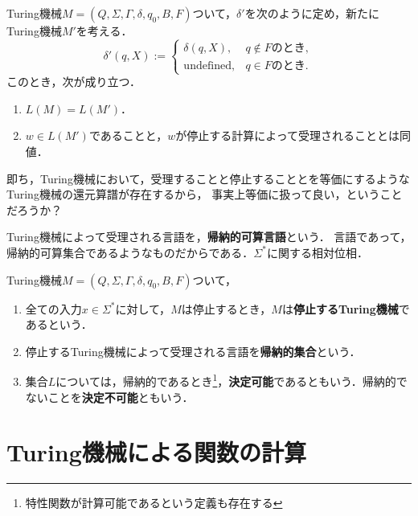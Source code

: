 \documentclass[uplatex, dvipdfmx]{jsreport}
\begin{document}
\begin{proposition}[Turing機械における停止の概念]\label{prop-haltness-in-Turing-machine}
    Turing機械$M=(Q,\Sigma,\Gamma,\delta,q_0,B,F)$ついて，$\delta'$を次のように定め，新たにTuring機械$M'$を考える．
    \[\delta'(q,X):=\begin{cases}
        \delta(q,X),&q\notin Fのとき,\\
        \mathrm{undefined},&q\in Fのとき.
    \end{cases}\]
    このとき，次が成り立つ．
    \begin{enumerate}
        \item $L(M)=L(M')$．
        \item $w\in L(M')$であることと，$w$が停止する計算によって受理されることとは同値．
    \end{enumerate}
\end{proposition}
\begin{remarks}
    即ち，Turing機械において，受理することと停止することとを等価にするようなTuring機械の還元算譜が存在するから，
    事実上等価に扱って良い，ということだろうか？
\end{remarks}

\begin{definition}
    Turing機械によって受理される言語を，\textbf{帰納的可算言語}という．
    言語であって，帰納的可算集合であるようなものだからである．$\Sigma^*$に関する相対位相．
\end{definition}

\begin{definition}
    Turing機械$M=(Q,\Sigma,\Gamma,\delta,q_0,B,F)$ついて，
    \begin{enumerate}
        \item 全ての入力$x\in\Sigma^*$に対して，$M$は停止するとき，$M$は\textbf{停止するTuring機械}であるという．
        \item 停止するTuring機械によって受理される言語を\textbf{帰納的集合}という．
        \item 集合$L$については，帰納的であるとき\footnote{特性関数が計算可能であるという定義も存在する}，\textbf{決定可能}であるともいう．帰納的でないことを\textbf{決定不可能}ともいう．
    \end{enumerate}
\end{definition}

\section{Turing機械による関数の計算}
\end{document}
